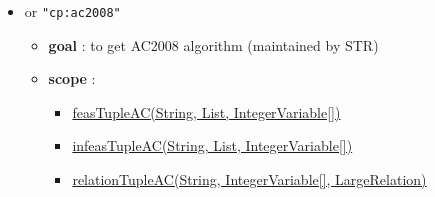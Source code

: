\begin{itemize}
\begin{itemize}
		\end{itemize}
		\item \label{cext2008:cext2008options}\hypertarget{cext2008:cext2008options}{}					
		 or \texttt{"cp:ac2008"}
		\begin{itemize}
				\item \textbf{goal} : to get AC2008 algorithm (maintained by STR)
				\item \textbf{scope} : 
					\begin{itemize}
						\item \hyperlink{feastupleac:feastupleacconstraint}{feasTupleAC(String, List, IntegerVariable[])}
						\item \hyperlink{infeastupleac:infeastupleacconstraint}{infeasTupleAC(String, List, IntegerVariable[])}
						\item \hyperlink{relationtupleac:relationtupleacconstraint}{relationTupleAC(String, IntegerVariable[], LargeRelation)}
					\end{itemize}	


\end{itemize}
\end{itemize}
